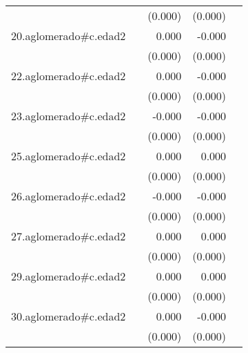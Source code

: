 {\begin{longtable}{l*{4}{D{.}{.}{-1}}}
            &                     &     (0.000)         &     (0.000)         &                     \\
\addlinespace
20.aglomerado#c.edad2&                     &       0.000         &      -0.000         &                     \\
            &                     &     (0.000)         &     (0.000)         &                     \\
\addlinespace
22.aglomerado#c.edad2&                     &       0.000         &      -0.000         &                     \\
            &                     &     (0.000)         &     (0.000)         &                     \\
\addlinespace
23.aglomerado#c.edad2&                     &      -0.000         &      -0.000\sym{*}  &                     \\
            &                     &     (0.000)         &     (0.000)         &                     \\
\addlinespace
25.aglomerado#c.edad2&                     &       0.000         &       0.000         &                     \\
            &                     &     (0.000)         &     (0.000)         &                     \\
\addlinespace
26.aglomerado#c.edad2&                     &      -0.000         &      -0.000         &                     \\
            &                     &     (0.000)         &     (0.000)         &                     \\
\addlinespace
27.aglomerado#c.edad2&                     &       0.000\sym{*}  &       0.000         &                     \\
            &                     &     (0.000)         &     (0.000)         &                     \\
\addlinespace
29.aglomerado#c.edad2&                     &       0.000         &       0.000         &                     \\
            &                     &     (0.000)         &     (0.000)         &                     \\
\addlinespace
30.aglomerado#c.edad2&                     &       0.000         &      -0.000         &                     \\
            &                     &     (0.000)         &     (0.000)         &                     \\

\end{longtable}}
